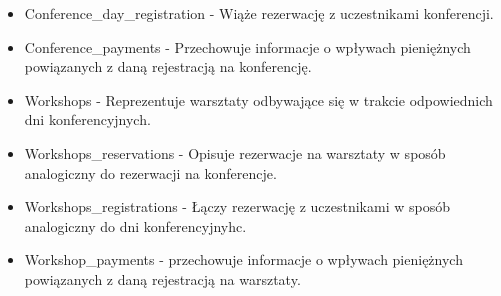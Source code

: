 \documentclass{article}
\begin{document}
\begin{itemize}
            \item Conference\_day\_registration - Wiąże rezerwację z uczestnikami konferencji. 
            
            \item Conference\_payments - Przechowuje informacje o wpływach pieniężnych powiązanych z daną rejestracją na konferencję. 
            
            \item Workshops - Reprezentuje warsztaty odbywające się w trakcie odpowiednich dni konferencyjnych. 
            
            \item Workshops\_reservations - Opisuje rezerwacje na warsztaty w sposób analogiczny do rezerwacji na konferencje. 
            
            \item Workshops\_registrations - Łączy rezerwację z uczestnikami w sposób analogiczny do dni konferencyjnyhc.
            
            \item Workshop\_payments - przechowuje informacje o wpływach pieniężnych powiązanych z daną rejestracją na warsztaty. 
        \end{itemize}
        
\end{document}
